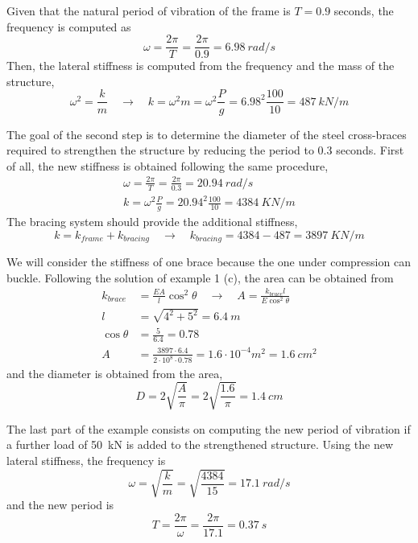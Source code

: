 \begin{Answer}[ref={frames_modification}]
Given that the natural period of vibration of the frame is $T=0.9$ seconds, the frequency is computed as
$$
\omega = \frac{2\pi}{T} = \frac{2\pi}{0.9} = \SI{6.98}{rad/s}
$$
Then, the lateral stiffness is computed from the frequency and the mass of the structure,
$$
\omega^2 = \frac{k}{m} \quad \rightarrow \quad
k = \omega^2m = \omega^2\frac{P}{g} = 6.98^2\frac{100}{10} = \SI{487}{kN/m}
$$

The goal of the second step is to determine the diameter of the steel cross-braces required to strengthen the structure by reducing the period to 0.3 seconds. First of all, the new stiffness is obtained following the same procedure,
\begin{align*}
\omega = \frac{2\pi}{T} = \frac{2\pi}{0.3} = \SI{20.94}{rad/s} \\
k = \omega^2\frac{P}{g} = 20.94^2\frac{100}{10} = \SI{4384}{KN/m}
\end{align*}
The bracing system should provide the additional stiffness,
$$
k = k_{frame} + k_{bracing} \quad \rightarrow \quad k_{bracing} = 4384 - 487 = \SI{3897}{KN/m}
$$

We will consider the stiffness of one brace because the one under compression can buckle. 
Following the solution of example 1 (c), the area can be obtained from
\begin{align*}
k_{brace} &= \frac{EA}{l}\cos^2\theta \quad \rightarrow \quad A = \frac{k_{brace}l}{E\cos^2\theta} \\
l &= \sqrt{4^2 + 5^2} = \SI{6.4}{m} \\
\cos\theta &= \frac{5}{6.4} = 0.78 \\
A &= \frac{3897\cdot 6.4}{2\cdot 10^8\cdot 0.78} = 1.6\cdot 10^{-4} m^2 = \SI{1.6}{cm^2}
\end{align*}
and the diameter is obtained from the area,
$$
D = 2\sqrt{\frac{A}{\pi}} = 2\sqrt{\frac{1.6}{\pi}} = \SI{1.4}{cm}
$$

The last part of the example consists on computing the new period of vibration if a further load of \qty{50}{kN} is added to the strengthened structure. Using the new lateral stiffness, the frequency is
$$
\omega = \sqrt{\frac{k}{m}} = \sqrt{\frac{4384}{15}} = \SI{17.1}{rad/s}
$$
and the new period is
$$
T = \frac{2\pi}{\omega} = \frac{2\pi}{17.1} = \SI{0.37}{s}
$$

\end{Answer}

